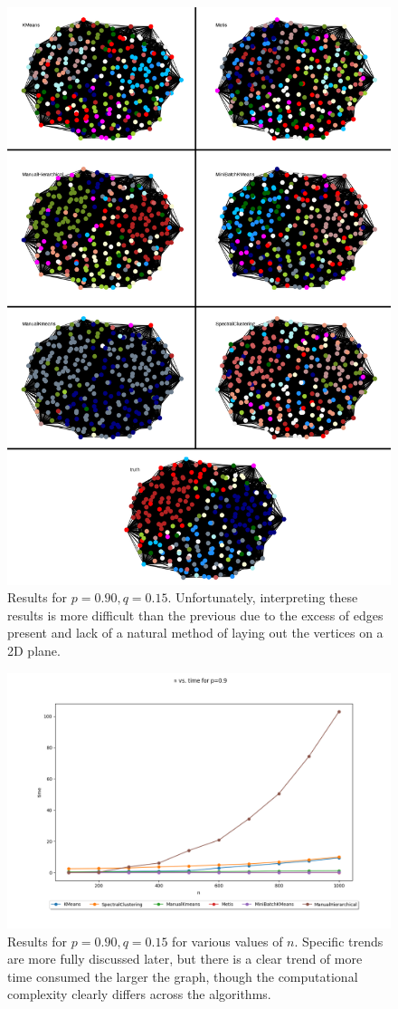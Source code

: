 \documentclass{article}
\begin{document}
\begin{figure}[H]
    \centering
    \includegraphics[width=.85\textwidth]{results/results_p-90_q-15.png}
    \caption[Clustering for $p=0.90,q=0.15$]{Results for $p=0.90,q=0.15$. Unfortunately, interpreting these results is more difficult than the previous due to the excess of edges present and lack of a natural method of laying out the vertices on a 2D plane.}
    \label{fig:results_p-90_q-15}
\end{figure}

\begin{figure}[H]
    \centering
    \includegraphics[width=.85\textwidth]{results/cluster_times.png}
    \caption[Clustering times across algorithms $p=0.90,q=0.20$]{Results for $p=0.90,q=0.15$ for various values of $n$. Specific trends are more fully discussed later, but there is a clear trend of more time consumed the larger the graph, though the computational complexity clearly differs across the algorithms.}
    \label{fig:cluster_times}
\end{figure}
\end{document}
